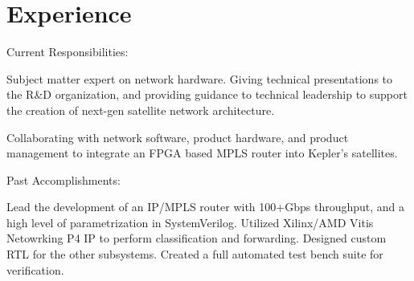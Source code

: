 \documentclass[10pt]{deedy-resume-reversed}
\begin{document}
%
%

%
%

%
%

\begin{minipage}[t]{1.0\textwidth}


\section{Experience}
Current Responsibilities:
\vspace{\topsep} %
\begin{tightemize}
\item Subject matter expert on network hardware. Giving technical presentations to the R\&D organization, and
providing guidance to technical leadership to support the creation of next-gen satellite network architecture.
\item Collaborating with network software, product hardware, and product management to integrate
an FPGA based MPLS router into Kepler's satellites.
\end{tightemize}
Past Accomplishments:
\begin{tightemize}
\item Lead the development of an IP/MPLS router with 100+Gbps throughput, and a high level of parametrization in SystemVerilog.
Utilized Xilinx/AMD Vitis Netowrking P4 IP to perform classification and forwarding. Designed custom RTL for the other
subsystems. Created a full automated test bench suite for verification.
\end{tightemize}
\sectionsep


\end{minipage}
\end{document}
